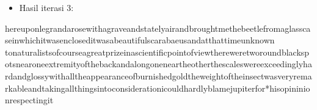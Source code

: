 \documentclass{article}
\begin{document}

\begin{itemize}
  \item Hasil iterasi 3:
\end{itemize}

\noindent hereuponlegrandarosewithagraveandstatelyairandbr\newline oughtmethebeetlefromaglasscaseinwhichitwasenclos\newline editwasabeautifulscarabaeusandatthattimeunknown t\newline onaturalistsofcourseagreatprizeinascientificpoin\newline tofviewthereweretworoundblackspotsnearoneextremi\newline tyofthebackandalongoneneartheotherthescalesweree\newline xceedinglyhardandglossywithalltheappearanceofbur\newline nishedgoldtheweightoftheinsectwasveryremarkablea\newline ndtakingallthingsintoconsiderationicouldhardlybl\newline amejupiterfor*hisopininionrespectingit
\end{document}

